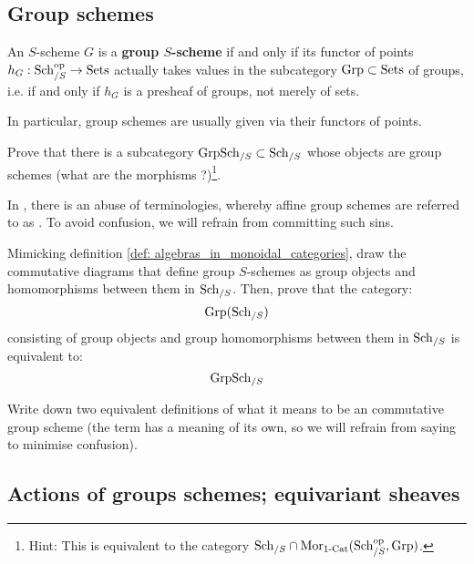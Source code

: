     \subsection{Group schemes}
        \begin{definition} \label{def: group_schemes}
            An $S$-scheme $G$ is a \textbf{group $S$-scheme} if and only if its functor of points $h_G: \mathrm{Sch}_{/S}^{\mathrm{op}} \to \mathrm{Sets}$ actually takes values in the subcategory $\mathrm{Grp} \subset \mathrm{Sets}$ of groups, i.e. if and only if $h_G$ is a presheaf of groups, not merely of sets.

            In particular, group schemes are usually given via their functors of points.
        \end{definition}
        \begin{question}
            Prove that there is a subcategory $\mathrm{Grp}\mathrm{Sch}_{/S} \subset \mathrm{Sch}_{/S}$ whose objects are group schemes (what are the morphisms ?)\footnote{Hint: This is equivalent to the category $\mathrm{Sch}_{/S} \cap \mathrm{Mor}_{1\text{-}\mathrm{Cat}}(\mathrm{Sch}_{/S}^{\mathrm{op}}, \mathrm{Grp})$.}.
        \end{question}
        \begin{remark}
            In \cite{jantzen_representations_of_algebraic_groups}, there is an abuse of terminologies, whereby affine group schemes are referred to as . To avoid confusion, we will refrain from committing such sins.
        \end{remark}
        \begin{question}
            Mimicking definition \ref{def: algebras_in_monoidal_categories}, draw the commutative diagrams that define group $S$-schemes as group objects and homomorphisms between them in $\mathrm{Sch}_{/S}$. Then, prove that the category:
                $$\mathrm{Grp}(\mathrm{Sch}_{/S})$$
            consisting of group objects and group homomorphisms between them in $\mathrm{Sch}_{/S}$ is equivalent to:
                $$\mathrm{Grp}\mathrm{Sch}_{/S}$$
        \end{question}
        \begin{question}
            Write down two equivalent definitions of what it means to be an commutative group scheme (the term  has a meaning of its own, so we will refrain from saying  to minimise confusion).
        \end{question}
        
    \subsection{Actions of groups schemes; equivariant sheaves}
